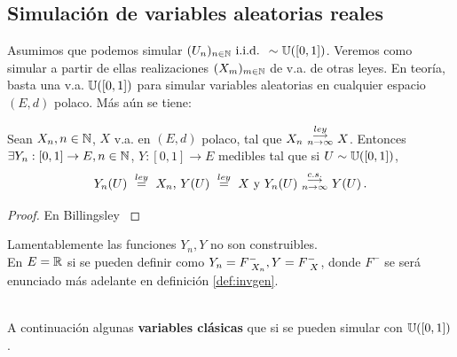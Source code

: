 \subsection{Simulación de variables aleatorias reales}  %
Asumimos que podemos simular $(U_n)_{n\in\mathbb{N}} \mbox{ i.i.d. } \sim \mathbb{U}([0,1])$. Veremos como simular a partir de ellas realizaciones $(X_m)_{m\in \mathbb{N}}$ de v.a. de otras leyes. En teoría, basta una v.a. $\mathbb{U}([0,1])$ para simular variables aleatorias en cualquier espacio $(E,d)$ polaco. Más aún se tiene:
\begin{theorem}
\label{sko}
Sean $X_n,n\in\mathbb{N}$, $X$ v.a. en $(E,d)$ polaco, tal que $X_n\mbox{ }\overset{ley}{\substack{\longrightarrow \\n \to \infty}}\mbox{ } X$. Entonces $\exists Y_n:[0,1]\to E,n\in\mathbb{N}$, $Y:[0,1]\to E$ medibles tal que si $U\sim\mathbb{U}([0,1])$,
$$ Y_n(U) \mbox{ }\overset{ley}{=}\mbox{ } X_n\mbox{,  } Y(U)\mbox{ }\overset{ley}{=}\mbox{ } X \mbox{ y }Y_n(U)\mbox{ }\overset{c.s.}{\substack{\longrightarrow \\n \to \infty}}\mbox{ } Y(U) \, .$$
\end{theorem}
\begin{proof}
\gris En Billingsley \cite{billing} \negro
\end{proof}
\begin{remark}
Lamentablemente las funciones $Y_n,Y$ no son construibles.%
\\ En $E=\mathbb{R}$ si se pueden definir como $Y_n=F^{-}_{\mbox{ }X_n},Y=F^-_{\mbox{ }X}$, donde $F^-$ se será enunciado más adelante en definición \ref{def:invgen}.
\end{remark}
\vspace{2cm}\\
A continuación algunas \textbf{variables clásicas} que si se pueden simular con $\mathbb{U}([0,1])$.
